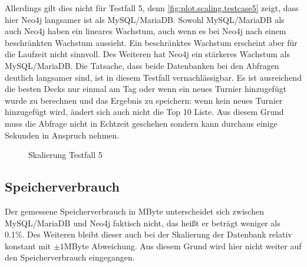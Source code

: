 Allerdings gilt dies nicht für Testfall 5, denn \autoref{fig:plot.scaling.testcase5} zeigt, dass hier Neo4j langsamer ist als MySQL/MariaDB. Sowohl MySQL/MariaDB als auch Neo4j haben ein lineares Wachstum, auch wenn es bei Neo4j nach einem beschränkten Wachstum aussieht. Ein beschränktes Wachstum erscheint aber für die Laufzeit nicht sinnvoll. Des Weiteren hat Neo4j ein stärkeres Wachstum als MySQL/MariaDB. Die Tatsache, dass beide Datenbanken bei den Abfragen deutlich langsamer sind, ist in diesem Testfall vernachlässigbar. Es ist ausreichend die besten Decks nur einmal am Tag oder wenn ein neues Turnier hinzugefügt wurde zu berechnen und das Ergebnis zu speichern: wenn kein neues Turnier hinzugefügt wird, ändert sich auch nicht die Top 10 Liste. Aus diesem Grund muss die Abfrage nicht in Echtzeit geschehen sondern kann durchaus einige Sekunden in Anspruch nehmen.


\begin{figure}[t]
    \myfloatalign
    \caption{Skalierung Testfall 5}
    \label{fig:plot.scaling.testcase5}
\end{figure}


\subsection{Speicherverbrauch}
Der gemessene Speicherverbrauch in MByte unterscheidet sich zwischen MySQL/MariaDB und Neo4j faktisch nicht, das heißt er beträgt weniger als 0.1\%. Des Weiteren bleibt dieser auch bei der Skalierung der Datenbank relativ konstant mit $\pm1$MByte Abweichung. Aus diesem Grund wird hier nicht weiter auf den Speicherverbrauch eingegangen.